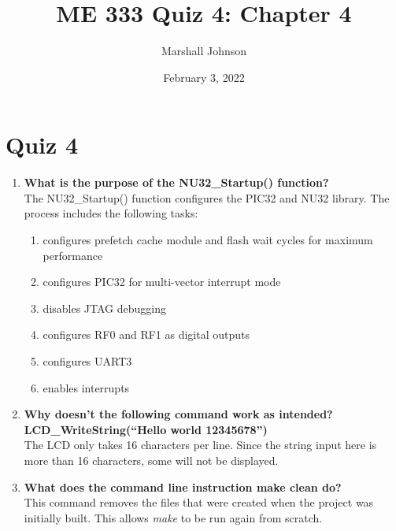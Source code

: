 \documentclass{article}
\title{ME 333 Quiz 4: Chapter 4}
\author{Marshall Johnson}
\date{February 3, 2022}
\begin{document}
\maketitle

\section*{Quiz 4}

\begin{enumerate}[label=\textbf{\arabic*})]
    \item \textbf{What is the purpose of the NU32\_Startup() function?} \\
    
    The NU32\_Startup() function configures the PIC32 and NU32 library. The process includes
    the following tasks: \\
    \begin{enumerate}
        \item configures prefetch cache module and flash wait cycles for maximum performance
        \item configures PIC32 for multi-vector interrupt mode
        \item disables JTAG debugging 
        \item configures RF0 and RF1 as digital outputs
        \item configures UART3
        \item enables interrupts
    \end{enumerate}

    \item \textbf{Why doesn’t the following command work as intended?  \\
    LCD\_WriteString(“Hello world 12345678”)} \\

    The LCD only takes 16 characters per line. Since the string input here is more than 16 characters,
    some will not be displayed.

    \item \textbf{What does the command line instruction make clean do?} \\
    
    This command removes the files that were created when the project was initially built. This
    allows \textit{make} to be run again from scratch.



\end{enumerate}
\end{document}
